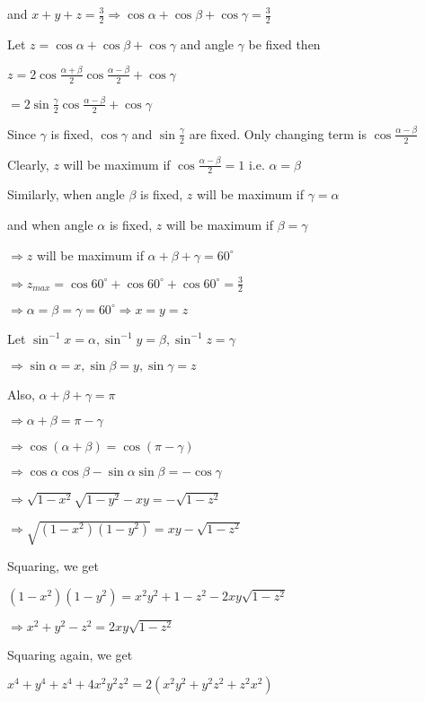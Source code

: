   and $x + y + z = \frac{3}{2} \Rightarrow \cos\alpha + \cos\beta + \cos\gamma = \frac{3}{2}$

  Let $z = \cos\alpha + \cos\beta + \cos\gamma$ and angle $\gamma$ be fixed then

  $z = 2\cos\frac{\alpha + \beta}{2}\cos\frac{\alpha - \beta}{2} + \cos\gamma$

  $= 2\sin\frac{\gamma}{2}\cos\frac{\alpha - \beta}{2} + \cos\gamma$

  Since $\gamma$ is fixed, $\cos\gamma$ and $\sin\frac{\gamma}{2}$ are fixed. Only changing term is
  $\cos\frac{\alpha - \beta}{2}$

  Clearly, $z$ will be maximum if $\cos\frac{\alpha - \beta}{2} = 1$ i.e. $\alpha = \beta$

  Similarly, when angle $\beta$ is fixed, $z$ will be maximum if $\gamma = \alpha$

  and when angle $\alpha$ is fixed, $z$ will be maximum if $\beta = \gamma$

  $\Rightarrow z$ will be maximum if $\alpha + \beta + \gamma = 60^\circ$

  $\Rightarrow z_{max} = \cos60^\circ + \cos60^\circ + \cos60^\circ = \frac{3}{2}$

  $\Rightarrow \alpha = \beta = \gamma = 60^\circ \Rightarrow x = y = z$

\item Let $\sin^{-1}x = \alpha, \sin^{-1}y = \beta, \sin^{-1}z = \gamma$

  $\Rightarrow \sin\alpha = x, \sin\beta = y, \sin\gamma = z$

  Also, $\alpha + \beta + \gamma = \pi$

  $\Rightarrow \alpha + \beta = \pi - \gamma$

  $\Rightarrow \cos(\alpha + \beta) = \cos(\pi - \gamma)$

  $\Rightarrow \cos\alpha\cos\beta - \sin\alpha\sin\beta = -\cos\gamma$

  $\Rightarrow \sqrt{1 - x^2}\sqrt{1 - y^2} - xy = -\sqrt{1 - z^2}$

  $\Rightarrow \sqrt{(1 - x^2)(1 - y^2)} = xy - \sqrt{1 - z^2}$

  Squaring, we get

  $(1 - x^2)(1 - y^2) = x^2y^2 + 1 - z^2 -2xy\sqrt{1 - z^2}$

  $\Rightarrow x^2 + y^2 - z^2 = 2xy\sqrt{1 - z^2}$

  Squaring again, we get

  $x^4 + y^4 + z^4 + 4x^2y^2z^2 = 2(x^2y^2 + y^2z^2 + z^2x^2)$

